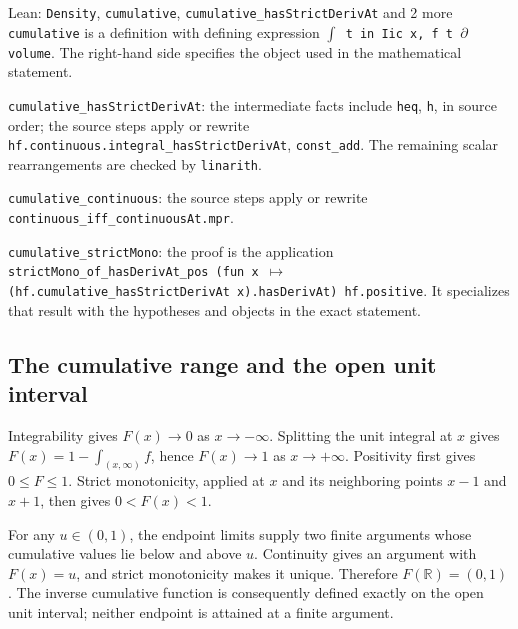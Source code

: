 \documentclass[11pt,a4paper]{report}
\begin{document}
\begin{leanbox}{Lean: \texttt{Density}, \texttt{cumulative}, \texttt{cumulative\_\allowbreak{}hasStrictDerivAt} and 2 more}
\texttt{cumulative} is a definition with defining expression \texttt{\ensuremath{\int} t in Iic x, f t \ensuremath{\partial}volume}. The right-hand side specifies the object used in the mathematical statement.



\texttt{cumulative\_\allowbreak{}has\allowbreak{}Strict\allowbreak{}Deriv\allowbreak{}At}: the intermediate facts include \texttt{heq}, \texttt{h}, in source order; the source steps apply or rewrite \texttt{hf.\allowbreak{}continuous.\allowbreak{}integral\_\allowbreak{}has\allowbreak{}Strict\allowbreak{}Deriv\allowbreak{}At}, \texttt{const\_\allowbreak{}add}. The remaining scalar rearrangements are checked by \texttt{linarith}.



\texttt{cumulative\_\allowbreak{}continuous}: the source steps apply or rewrite \texttt{continuous\_\allowbreak{}iff\_\allowbreak{}continuous\allowbreak{}At.\allowbreak{}mpr}.



\texttt{cumulative\_\allowbreak{}strict\allowbreak{}Mono}: the proof is the application \texttt{strict\allowbreak{}Mono\_\allowbreak{}of\_\allowbreak{}has\allowbreak{}Deriv\allowbreak{}At\_\allowbreak{}pos (fun x \ensuremath{\mapsto} (hf.\allowbreak{}cumulative\_\allowbreak{}has\allowbreak{}Strict\allowbreak{}Deriv\allowbreak{}At x).\allowbreak{}has\allowbreak{}Deriv\allowbreak{}At) hf.\allowbreak{}positive}. It specializes that result with the hypotheses and objects in the exact statement.
\end{leanbox}
\subsection{\texorpdfstring{The cumulative range and the open unit interval}{The cumulative range and the open unit interval}}
\label{report-step-IPLA-PrekopaLeindler-lean-2}


Integrability gives \(F(x)\to0\) as \(x\to-\infty\). Splitting the unit integral at \(x\) gives \(F(x)=1-\int_{(x,\infty)}f\), hence \(F(x)\to1\) as \(x\to+\infty\). Positivity first gives \(0\le F\le1\). Strict monotonicity, applied at \(x\) and its neighboring points \(x-1\) and \(x+1\), then gives \(0<F(x)<1\).



For any \(u\in(0,1)\), the endpoint limits supply two finite arguments whose cumulative values lie below and above \(u\). Continuity gives an argument with \(F(x)=u\), and strict monotonicity makes it unique. Therefore \(F(\mathbb R)=(0,1)\). The inverse cumulative function is consequently defined exactly on the open unit interval; neither endpoint is attained at a finite argument.
\end{document}
